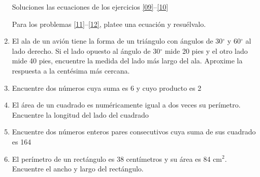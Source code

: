 \documentclass[letterpaper]{article}
\begin{document}
\begin{multicols}{2}
\begin{enumerate}
Soluciones las ecuaciones de los ejercicios \ref{09}--\ref{10}
Para los problemas \ref{11}--\ref{12}, platee una ecuación y resuélvalo.
\item \label{11} El ala de un avión tiene la forma de un triángulo con ángulos de 30$^{\circ}$ y 60$^{\circ}$ al lado derecho. Si el lado opuesto al ángulo de 30$^{\circ}$ mide 20 pies y el otro lado mide 40 pies, encuentre la medida del lado más largo del ala. Aproxime la respuesta a la centésima más cercana.
\item Encuentre dos números cuya suma es 6 y cuyo producto es 2
\item El área de un cuadrado es numéricamente igual a dos veces su perímetro. Encuentre la longitud del lado del cuadrado
\item Encuentre dos números enteros pares consecutivos cuya suma de sus cuadrado es 164
\item \label{12} El perímetro de un rectángulo es 38 centímetros y su área es 84 cm$^{2}$. Encuentre el ancho y largo del rectángulo.
\end{enumerate}
\end{multicols}
\end{document}
